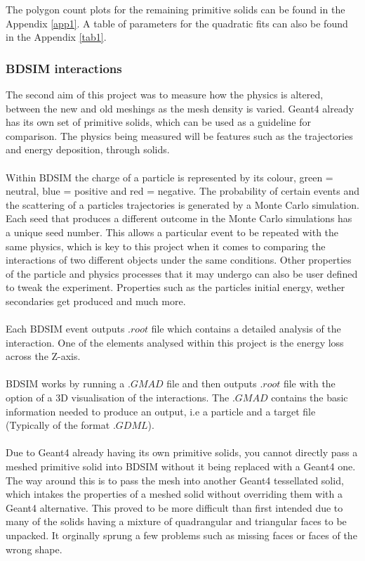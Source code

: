 \documentclass[12pt,a4paper]{article}
\begin{document}
\noindent The polygon count plots for the remaining primitive solids can be found in the Appendix \ref{app1}. A table of parameters for the quadratic fits can also be found in the Appendix \ref{tab1}. 
\newpage
\subsubsection{BDSIM interactions}
The second aim of this project was to measure how the physics is altered, between the new and old meshings as the mesh density is varied. Geant4 already has its own set of primitive solids, which can be used as a guideline for comparison. The physics being measured will be features such as the trajectories and energy deposition, through solids.
\\\\
Within BDSIM the charge of a particle is represented by its colour, green = neutral, blue = positive and red = negative. The probability of certain events and the scattering of a particles trajectories is generated by a Monte Carlo simulation. Each seed that produces a different outcome in the Monte Carlo simulations has a unique seed number. This allows a particular event to be repeated with the same physics, which is key to this project when it comes to comparing the interactions of two different objects under the same conditions. Other properties of the particle and physics processes that it may undergo can also be user defined to tweak the experiment. Properties such as the particles initial energy, wether secondaries get produced and much more.
\\\\
Each BDSIM event outputs $.root$ file which contains a detailed analysis of the interaction. One of the elements analysed within this project is the energy loss across the Z-axis.
\\\\
BDSIM works by running a $.GMAD$ file and then outputs $.root$ file with the option of a 3D visualisation of the interactions. The $.GMAD$ contains the basic information needed to produce an output, i.e a particle and a target file (Typically of the format $.GDML$).
\\\\
Due to Geant4 already having its own primitive solids, you cannot directly pass a meshed primitive solid into BDSIM without it being replaced with a Geant4 one. The way around this is to pass the mesh into another Geant4 tessellated solid, which intakes the properties of a meshed solid without overriding them with a Geant4 alternative. This proved to be more difficult than first intended due to many of the solids having a mixture of quadrangular and triangular faces to be unpacked. It orginally sprung a few problems such as missing faces or faces of the wrong shape. 
\end{document}
